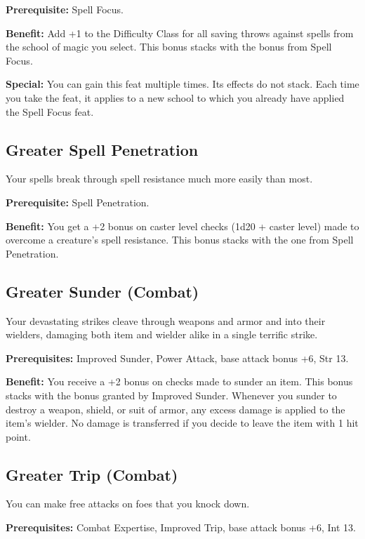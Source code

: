 \textbf{Prerequisite:} Spell Focus.
				
\textbf{Benefit:} Add +1 to the Difficulty Class for all saving throws against spells from the school of magic you select. This bonus stacks with the bonus from Spell Focus.
				
\textbf{Special:} You can gain this feat multiple times. Its effects do not stack. Each time you take the feat, it applies to a new school to which you already have applied the Spell Focus feat.
				
\subsection{Greater Spell Penetration}

				
Your spells break through spell resistance much more easily than most.
				
\textbf{Prerequisite:} Spell Penetration.
				
\textbf{Benefit:} You get a +2 bonus on caster level checks (1d20 + caster level) made to overcome a creature's spell resistance. This bonus stacks with the one from Spell Penetration.
				
\subsection{Greater Sunder (Combat)}

				
Your devastating strikes cleave through weapons and armor and into their wielders, damaging both item and wielder alike in a single terrific strike.
				
\textbf{Prerequisites:} Improved Sunder, Power Attack, base attack bonus +6, Str 13.
				
\textbf{Benefit:} You receive a +2 bonus on checks made to sunder an item. This bonus stacks with the bonus granted by Improved Sunder. Whenever you sunder to destroy a weapon, shield, or suit of armor, any excess damage is applied to the item's wielder. No damage is transferred if you decide to leave the item with 1 hit point.
				
\subsection{Greater Trip (Combat)}

				
You can make free attacks on foes that you knock down.
				
\textbf{Prerequisites:} Combat Expertise, Improved Trip, base attack bonus +6, Int 13.
				
